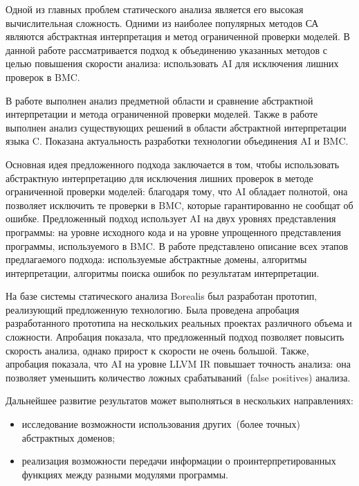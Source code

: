 \conclusion
Одной из главных проблем статического анализа является его высокая 
вычислительная сложность. Одними из наиболее популярных методов СА являются 
абстрактная интерпретация и метод ограниченной проверки моделей.
В данной работе рассматривается подход к объединению указанных методов с целью
повышения скорости анализа: использовать AI для исключения лишних проверок в BMC.

В работе выполнен анализ предметной области и сравнение абстрактной интерпретации
и метода ограниченной проверки моделей. Также в работе выполнен анализ 
существующих решений в области абстрактной интерпретации языка C. Показана 
актуальность разработки технологии объединения AI и BMC.

Основная идея предложенного подхода заключается в том, чтобы использовать 
абстрактную интерпретацию для исключения лишних проверок в методе ограниченной 
проверки моделей: благодаря тому, что AI обладает полнотой, она позволяет 
исключить те проверки в BMC, которые гарантированно не сообщат об ошибке. 
Предложенный подход использует AI на двух уровнях представления программы:
на уровне исходного кода и на уровне упрощенного представления программы, 
используемого в BMC. В работе представлено описание всех этапов предлагаемого
подхода: используемые абстрактные домены, алгоритмы интерпретации, алгоритмы 
поиска ошибок по результатам интерпретации.

На базе системы статического анализа Borealis был разработан прототип, 
реализующий предложенную технологию. Была проведена апробация разработанного
прототипа на нескольких реальных проектах различного объема и сложности. 
Апробация показала, что предложенный подход позволяет повысить скорость анализа,
однако прирост к скорости не очень большой. Также, апробация показала, что
AI на уровне LLVM IR повышает точность анализа: она позволяет уменьшить
количество ложных срабатываний~(false positives) анализа.

Дальнейшее развитие результатов может выполняться в нескольких направлениях:
\begin{itemize}
\item исследование возможности использования других~(более точных) абстрактных
доменов;
\item реализация возможности передачи информации о проинтерпретированных функциях
между разными модулями программы.
\end{itemize}